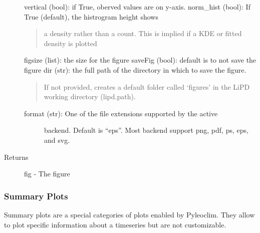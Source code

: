 \documentclass[letterpaper,10pt,english]{sphinxmanual}
\begin{document}
\begin{fulllineitems}
\begin{description}
\begin{description}
\end{description}

vertical (bool): if True, oberved values are on y-axis.
norm\_hist (bool): If True (default), the histrogram height shows
\begin{quote}

a density rather than a count. This is implied if a KDE or
fitted density is plotted
\end{quote}

figsize (list): the size for the figure
saveFig (bool): default is to not save the figure
dir (str): the full path of the directory in which to save the figure.
\begin{quote}

If not provided, creates a default folder called ‘figures’ in the
LiPD working directory (lipd.path).
\end{quote}
\begin{description}
\item[{format (str): One of the file extensions supported by the active}] \leavevmode
backend. Default is “eps”. Most backend support png, pdf, ps, eps,
and svg.

\end{description}

\item[{Returns}] \leavevmode
fig - The figure

\end{description}

\end{fulllineitems}



\subsubsection{Summary Plots}
\label{\detokenize{Main:summary-plots}}
Summary plots are a special categories of plots enabled by Pyleoclim.
They allow to plot specific information about a timeseries but are not customizable.
\end{document}
